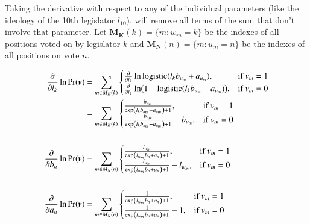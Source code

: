 \documentclass{article}
\newcommand\logistic{\text{logistic}}
\begin{document}
Taking the derivative with respect to any of the individual parameters (like the ideology of the 10th legislator $l_{10}$),
will remove all terms of the sum that don't involve that parameter. Let $\boldsymbol{M_K}(k) = \{m: w_m = k\}$ be the indexes of all positions voted on by legislator $k$ and $\boldsymbol{M_N}(n) = \{m: u_m = n\}$ be the indexes of all positions on vote $n$.

\begin{align*}
    \pdv{l_k} \ln \Pr (\boldsymbol{v}) &= \sum_{m \in M_K(k)} \begin{cases}
            \pdv{l_k} \ln \logistic(l_k  b_{u_m} +  a_{u_m}),& \text{if } v_m = 1\\
            \pdv{l_k} \ln (1 - \logistic(l_k  b_{u_m} +  a_{u_m})),              & \text{if } v_m = 0\\
        \end{cases} \\
    &= \sum_{m \in M_K(k)} \begin{cases}
            \frac{
                b_{u_m}
            }{
                \exp(l_k   b_{u_m} +  a_{u_m}) + 1
            },& \text{if } v_m = 1\\
            \frac{
                b_{u_m}
            }{
                \exp(l_k   b_{u_m} +  a_{u_m}) + 1
            } -  b_{u_m},& \text{if } v_m = 0\\
        \end{cases} \\
    \\
    \pdv{b_n} \ln \Pr (\boldsymbol{v}) &= \sum_{m \in M_N(n)} \begin{cases}
            \frac{
                l_{w_m}
            }{
                \exp(l_{w_m}   b_n +  a_n) + 1
            },& \text{if } v_m = 1\\
            \frac{
                l_{w_m}
            }{
                \exp(l_{w_m}   b_n +  a_n) + 1
            } -  l_{w_m},& \text{if } v_m = 0\\
        \end{cases} \\
    \\
    \pdv{a_n} \ln \Pr (\boldsymbol{v}) &= \sum_{m \in M_N(n)} \begin{cases}
            \frac{
               1
            }{
                \exp(l_{w_m}   b_n +  a_n) + 1
            },& \text{if } v_m = 1\\
            \frac{
                1
            }{
                \exp(l_{w_m}   b_n +  a_n) + 1
            } - 1,& \text{if } v_m = 0\\
        \end{cases} \\
\end{align*}
\end{document}

